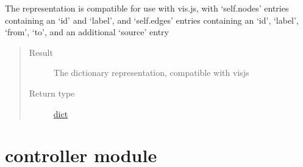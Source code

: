 \documentclass[letterpaper,10pt,english]{sphinxmanual}
\begin{document}
\begin{fulllineitems}
\begin{fulllineitems}
The representation is compatible for use with vis.js, with `self.nodes' entries containing an `id' and `label', and `self.edges' entries containing an `id', `label', `from', `to', and an additional `source' entry
\begin{quote}\begin{description}
\item[{Result}] \leavevmode
The dictionary representation, compatible with visjs

\item[{Return type}] \leavevmode
\href{https://docs.python.org/2/library/stdtypes.html\#dict}{dict}

\end{description}\end{quote}

\end{fulllineitems}


\end{fulllineitems}



\section{controller module}
\label{\detokenize{controller:controller-module}}\label{\detokenize{controller::doc}}\label{\detokenize{controller:module-controller}}
\end{document}
